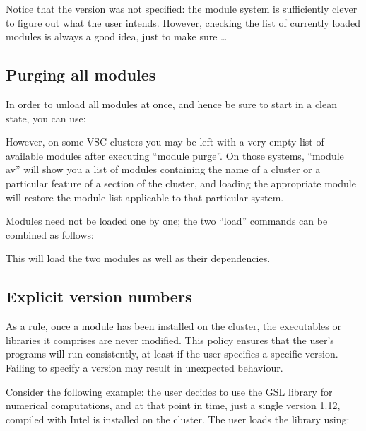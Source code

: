 Notice that the version was not specified: the module system is sufficiently
clever to figure out what the user intends. However, checking the list of
currently loaded modules is always a good idea, just to make sure \ldots

\subsection{Purging all modules}
\label{subsec:purging-modules}

In order to unload all modules at once, and hence be sure to start in a clean
state, you can use:

\begin{prompt}
\end{prompt}

However, on some VSC clusters you may be left with a very empty list of available
modules after executing ``module purge''. On those systems, ``module av'' will show you a list of
modules containing the name of a cluster or a particular feature of a section of
the cluster, and loading the appropriate module will restore the module list
applicable to that particular system.

Modules need not be loaded one by one; the two ``load'' commands can be
combined as follows:

\ifleuven
\begin{prompt}
\end{prompt}
\else
\begin{prompt}
\end{prompt}
\fi

This will load the two modules as well as their dependencies.

\subsection{Explicit version numbers}

As a rule, once a module has been installed on the cluster, the executables or
libraries it comprises are never modified. This policy ensures that the user's
programs will run consistently, at least if the user specifies a specific
version. Failing to specify a version may result in unexpected behaviour.

Consider the following example: the user decides to use the GSL library for
numerical computations, and at that point in time, just a single version 1.12,
compiled with Intel is installed on the cluster. The user loads the library
using:

